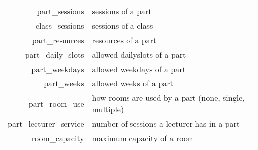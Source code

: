 \begin{table}[!ht]
\centering
{\small
\begin{tabular}{|rl|}
\hline
part\_sessions              & sessions of a part \\%
class\_sessions             & sessions of a class \\%
part\_resources            & resources of a part\\%
part\_daily\_slots          & allowed dailyslots of a part\\%
part\_weekdays              & allowed weekdays of a part\\%
part\_weeks                 & allowed weeks of a part\\%
part\_room\_use             & how rooms are used by a part (none, single, multiple)\\%
part\_lecturer\_service      & number of sessions a lecturer has in a part\\%
room\_capacity              & maximum capacity of a room\\%

\end{tabular}}
\end{table}
